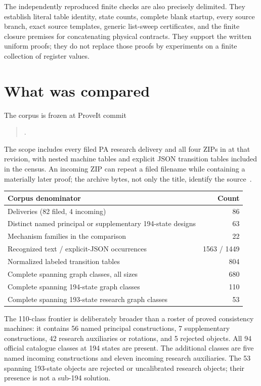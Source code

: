 The independently reproduced finite checks are also precisely delimited.
They establish literal table identity, state counts, complete blank
startup, every source branch, exact source templates, generic list-sweep
certificates, and the finite closure premises for concatenating physical
contracts. They support the written uniform proofs; they do not replace
those proofs by experiments on a finite collection of register values.

\section{What was compared}
\label{sec:comparison}

The corpus is frozen at ProveIt commit
\begin{quote}\small
{}.
\end{quote}
The scope includes every filed PA research delivery and all four ZIPs in
 at that revision, with nested machine tables and
explicit JSON transition tables included in the census. An incoming ZIP
can repeat a filed filename while containing a materially later proof;
the archive bytes, not only the title, identify the source~\cite{repo,ax11h}.

\begin{center}\small
\begin{tabular}{lr}
\toprule
Corpus denominator & Count\\
\midrule
Deliveries (82 filed, 4 incoming) & 86\\
Distinct named principal or supplementary 194-state designs & 63\\
Mechanism families in the comparison & 22\\
Recognized text / explicit-JSON occurrences & 1563 / 1449\\
Normalized labeled transition tables & 804\\
Complete spanning graph classes, all sizes & 680\\
Complete spanning 194-state graph classes & 110\\
Complete spanning 193-state research graph classes & 53\\
\bottomrule
\end{tabular}
\end{center}

The 110-class frontier is deliberately broader than a roster of proved
consistency machines: it contains 56 named principal constructions,
7 supplementary constructions, 42 research auxiliaries or rotations, and
5 rejected objects. All 94 official catalogue classes at 194 states are
present. The additional classes are five named incoming constructions and
eleven incoming research auxiliaries. The 53 spanning 193-state objects
are rejected or uncalibrated research objects; their presence is not a
sub-194 solution.

